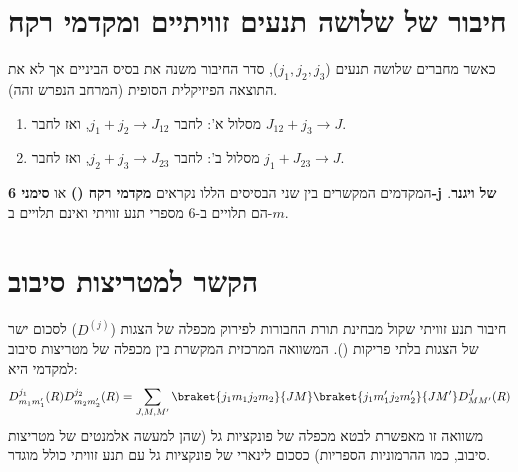 \section{חיבור של שלושה תנעים זוויתיים ומקדמי רקח}
כאשר מחברים שלושה תנעים ($j_1, j_2, j_3$), סדר החיבור משנה את בסיס הביניים אך לא את התוצאה הפיזיקלית הסופית (המרחב הנפרש זהה).
\begin{enumerate}
    \item מסלול א': לחבר $j_1+j_2 \to J_{12}$, ואז לחבר $J_{12}+j_3 \to J$.
    \item מסלול ב': לחבר $j_2+j_3 \to J_{23}$, ואז לחבר $j_1+J_{23} \to J$.
\end{enumerate}
המקדמים המקשרים בין שני הבסיסים הללו נקראים \textbf{מקדמי רקח ()} או \textbf{סימני 6-j של ויגנר}. הם תלויים ב-6 מספרי תנע זוויתי ואינם תלויים ב-$m$.

\section{הקשר למטריצות סיבוב }
חיבור תנע זוויתי שקול מבחינת תורת החבורות לפירוק מכפלה של הצגות ($D^{(j)}$) לסכום ישר של הצגות בלתי פריקות ().
המשוואה המרכזית המקשרת בין מכפלה של מטריצות סיבוב למקדמי  היא:
\[
D^{j_1}_{m_1 m'_1}(R) D^{j_2}_{m_2 m'_2}(R) = \sum_{J, M, M'} \braket{j_1 m_1 j_2 m_2}{J M} \braket{j_1 m'_1 j_2 m'_2}{J M'} D^{J}_{M M'}(R)
\]
משוואה זו מאפשרת לבטא מכפלה של פונקציות גל (שהן למעשה אלמנטים של מטריצות סיבוב, כמו ההרמוניות הספריות) כסכום לינארי של פונקציות גל עם תנע זוויתי כולל מוגדר.
